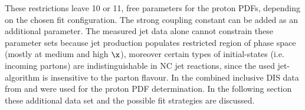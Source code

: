 These restrictions leave 10 or 11, free parameters for the proton PDFs, depending on the chosen fit configuration. The strong coupling constant \asz can be added as an additional parameter. The measured jet data alone cannot constrain these parameter sets because jet production populates restricted region of phase space (mostly at medium and high $\x$), moreover certain types of initial-states (i.e. incoming partons) are indistinguishable in NC jet reactions, since the used jet-algorithm is insensitive to the parton flavour. In  the combined inclusive DIS data from \hone and \zeus were used for the proton PDF determination. In the following section these additional data set and the possible fit strategies are discussed.
